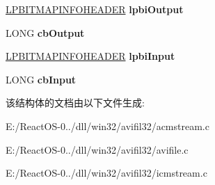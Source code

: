 \begin{DoxyCompactItemize}
\mbox{\label{struct___i_a_v_i_stream_impl_a128ed4bc27035235f19e779a6851f073}} 
\hyperlink{struct_b_i_t_m_a_p_i_n_f_o_h_e_a_d_e_r}{L\+P\+B\+I\+T\+M\+A\+P\+I\+N\+F\+O\+H\+E\+A\+D\+ER} {\bfseries lpbi\+Output}
\item 
\mbox{\label{struct___i_a_v_i_stream_impl_a5e3bb87f468b3279e4c81d54813f9f52}} 
L\+O\+NG {\bfseries cb\+Output}
\item 
\mbox{\label{struct___i_a_v_i_stream_impl_aac5b65dcab2a88773b8fad7089e80fdd}} 
\hyperlink{struct_b_i_t_m_a_p_i_n_f_o_h_e_a_d_e_r}{L\+P\+B\+I\+T\+M\+A\+P\+I\+N\+F\+O\+H\+E\+A\+D\+ER} {\bfseries lpbi\+Input}
\item 
\mbox{\label{struct___i_a_v_i_stream_impl_ac82a9a207acffa65f588a4adc459f722}} 
L\+O\+NG {\bfseries cb\+Input}
\end{DoxyCompactItemize}


该结构体的文档由以下文件生成\+:\begin{DoxyCompactItemize}
\item 
E\+:/\+React\+O\+S-\/0../dll/win32/avifil32/acmstream.\+c\item 
E\+:/\+React\+O\+S-\/0../dll/win32/avifil32/avifile.\+c\item 
E\+:/\+React\+O\+S-\/0../dll/win32/avifil32/icmstream.\+c\end{DoxyCompactItemize}
